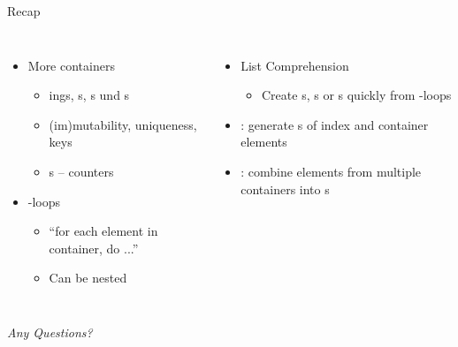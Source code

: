 
\begin{frame}{Recap}
%
\begin{columns}[T]
\begin{itemize}
\item More containers
	\begin{itemize}
	\item {}ings, s, s und s
	\item (im)mutability, uniqueness, keys
	\item {}s -- counters
	\end{itemize}
\item {}-loops
	\begin{itemize}
	\item \enquote{for each element in container, do ...}
	\item Can be nested
	\end{itemize}
\end{itemize}
%
\begin{itemize}
\item List Comprehension
	\begin{itemize}
	\item Create s, s or s quickly from -loops
	\end{itemize}
\item {}: generate s of index and container elements
\item {}: combine elements from multiple containers into s
\end{itemize}

\end{columns}
%
\begin{center}
	\emph{Any Questions?}
\end{center}
%
\end{frame}


